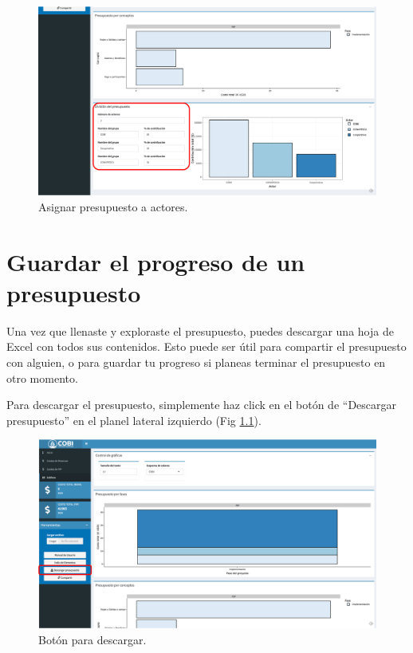\documentclass[
]{book}
\begin{document}
\begin{figure}
\includegraphics[width=61.11in]{images/exp-5} \caption{Asignar presupuesto a actores.}\label{fig:exp-5}
\end{figure}

\hypertarget{guardar}{%
\chapter{Guardar el progreso de un presupuesto}\label{guardar}}

Una vez que llenaste y exploraste el presupuesto, puedes descargar una hoja de Excel con todos sus contenidos. Esto puede ser útil para compartir el presupuesto con alguien, o para guardar tu progreso si planeas terminar el presupuesto en otro momento.

Para descargar el presupuesto, simplemente haz click en el botón de ``Descargar presupuesto'' en el planel lateral izquierdo (Fig \ref{fig:down-1}).

\begin{figure}
\includegraphics[width=61.24in]{images/down-1} \caption{Botón para descargar.}\label{fig:down-1}
\end{figure}
\end{document}
